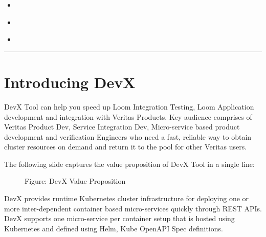 \documentclass[letterpaper,10pt,english]{sphinxmanual}
\begin{document}
\begin{sphinxShadowBox}
\begin{itemize}
\begin{itemize}
\end{itemize}

\item {} 
\label{\detokenize{devx:id15}}{\hyperref[\detokenize{devx:devx-security}]{}}

\item {} 
\label{\detokenize{devx:id16}}{\hyperref[\detokenize{devx:devx-tutorial-video}]{}}

\item {} 
\label{\detokenize{devx:id17}}{\hyperref[\detokenize{devx:other-devx-references}]{}}

\end{itemize}
\end{sphinxShadowBox}
\label{\detokenize{devx:para-intro}}

\bigskip\hrule\bigskip



\chapter{Introducing DevX}
\label{\detokenize{devx:introducing-devx}}\label{\detokenize{devx:content-all-devx}}\label{\detokenize{devx:devx-user-guide}}
DevX Tool can help you speed up Loom Integration Testing, Loom Application development and integration with Veritas Products. Key audience comprises of Veritas Product Dev, Service Integration Dev, Micro-service based product development and verification Engineers who need a fast, reliable way to obtain cluster resources on demand and return it to the pool for other Veritas users.

The following slide captures the value proposition of DevX Tool in a single line:

\begin{figure}[htbp]
\centering
\capstart

\noindent{}
\caption{Figure: DevX Value Proposition}\label{\detokenize{devx:id1}}\end{figure}

DevX provides runtime Kubernetes cluster infrastructure for deploying one or more inter-dependent container based micro-services quickly through REST APIs. DevX supports one micro-service per container setup that is hosted using Kubernetes and defined using Helm, Kube OpenAPI Spec definitions.
\end{document}
